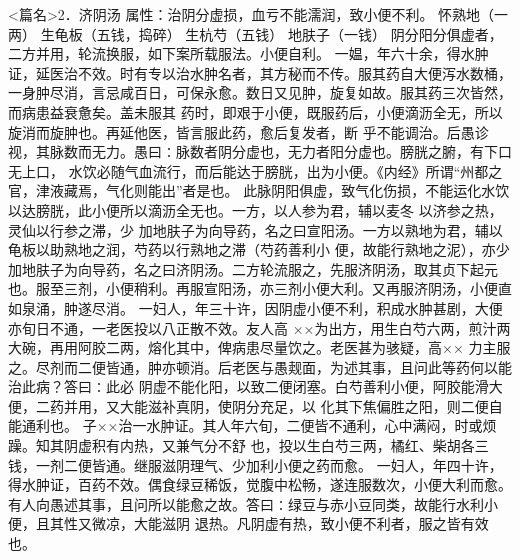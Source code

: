 \documentclass[a4paper,12pt,UTF8,twoside]{ctexbook}
\begin{document}
<篇名>2．济阴汤
属性：治阴分虚损，血亏不能濡润，致小便不利。 
怀熟地（一两） 生龟板（五钱，捣碎） 生杭芍（五钱） 地肤子（一钱） 
阴分阳分俱虚者，二方并用，轮流换服，如下案所载服法。小便自利。 
一媪，年六十余，得水肿证，延医治不效。时有专以治水肿名者，其方秘而不传。服其药自大便泻水数桶， 
一身肿尽消，言忌咸百日，可保永愈。数日又见肿，旋复如故。服其药三次皆然，而病患益衰惫矣。盖未服其 
药时，即艰于小便，既服药后，小便滴沥全无，所以旋消而旋肿也。再延他医，皆言服此药，愈后复发者，断 
乎不能调治。后愚诊视，其脉数而无力。愚曰∶脉数者阴分虚也，无力者阳分虚也。膀胱之腑，有下口无上口， 
水饮必随气血流行，而后能达于膀胱，出为小便。《内经》所谓“州都之官，津液藏焉，气化则能出”者是也。 
此脉阴阳俱虚，致气化伤损，不能运化水饮以达膀胱，此小便所以滴沥全无也。一方，以人参为君，辅以麦冬 
以济参之热，灵仙以行参之滞，少 
加地肤子为向导药，名之曰宣阳汤。一方以熟地为君，辅以龟板以助熟地之润，芍药以行熟地之滞（芍药善利小 
便，故能行熟地之泥），亦少加地肤子为向导药，名之曰济阴汤。二方轮流服之，先服济阴汤，取其贞下起元 
也。服至三剂，小便稍利。再服宣阳汤，亦三剂小便大利。又再服济阴汤，小便直如泉涌，肿遂尽消。 
一妇人，年三十许，因阴虚小便不利，积成水肿甚剧，大便亦旬日不通，一老医投以八正散不效。友人高 
××为出方，用生白芍六两，煎汁两大碗，再用阿胶二两，熔化其中，俾病患尽量饮之。老医甚为骇疑，高×× 
力主服之。尽剂而二便皆通，肿亦顿消。后老医与愚觌面，为述其事，且问此等药何以能治此病？答曰∶此必 
阴虚不能化阳，以致二便闭塞。白芍善利小便，阿胶能滑大便，二药并用，又大能滋补真阴，使阴分充足，以 
化其下焦偏胜之阳，则二便自能通利也。 
子××治一水肿证。其人年六旬，二便皆不通利，心中满闷，时或烦躁。知其阴虚积有内热，又兼气分不舒 
也，投以生白芍三两，橘红、柴胡各三钱，一剂二便皆通。继服滋阴理气、少加利小便之药而愈。 
一妇人，年四十许，得水肿证，百药不效。偶食绿豆稀饭，觉腹中松畅，遂连服数次，小便大利而愈。 
有人向愚述其事，且问所以能愈之故。答曰∶绿豆与赤小豆同类，故能行水利小便，且其性又微凉，大能滋阴 
退热。凡阴虚有热，致小便不利者，服之皆有效也。 
\end{document}
